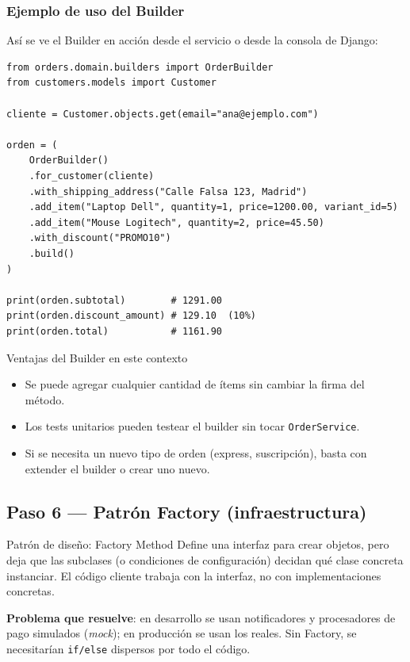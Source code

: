 \documentclass[12pt, a4paper]{article}
\begin{document}
\subsubsection{Ejemplo de uso del Builder}

Así se ve el Builder en acción desde el servicio o desde la consola de Django:

\begin{lstlisting}[caption={Uso del Builder — ejemplo}]
from orders.domain.builders import OrderBuilder
from customers.models import Customer

cliente = Customer.objects.get(email="ana@ejemplo.com")

orden = (
    OrderBuilder()
    .for_customer(cliente)
    .with_shipping_address("Calle Falsa 123, Madrid")
    .add_item("Laptop Dell", quantity=1, price=1200.00, variant_id=5)
    .add_item("Mouse Logitech", quantity=2, price=45.50)
    .with_discount("PROMO10")
    .build()
)

print(orden.subtotal)        # 1291.00
print(orden.discount_amount) # 129.10  (10%)
print(orden.total)           # 1161.90
\end{lstlisting}

\begin{tipbox}{Ventajas del Builder en este contexto}
\begin{itemize}
    \item Se puede agregar cualquier cantidad de ítems sin cambiar la firma del método.
    \item Los tests unitarios pueden testear el builder sin tocar \texttt{OrderService}.
    \item Si se necesita un nuevo tipo de orden (express, suscripción), basta con extender el builder o crear uno nuevo.
\end{itemize}
\end{tipbox}

\subsection{Paso 6 — Patrón Factory (infraestructura)}

\begin{conceptbox}{Patrón de diseño: Factory Method}
Define una interfaz para crear objetos, pero deja que las subclases (o condiciones de configuración) decidan qué clase concreta instanciar. El código cliente trabaja con la interfaz, no con implementaciones concretas.

\textbf{Problema que resuelve}: en desarrollo se usan notificadores y procesadores de pago simulados (\textit{mock}); en producción se usan los reales. Sin Factory, se necesitarían \texttt{if/else} dispersos por todo el código.
\end{conceptbox}
\end{document}
